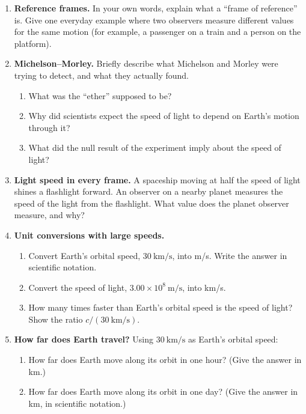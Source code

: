 \documentclass[12pt, twoside]{article}
\begin{document}
\begin{enumerate}[itemsep=0.5cm]

\item \textbf{Reference frames.} In your own words, explain what a ``frame of reference'' is. Give one everyday example where two observers measure different values for the same motion (for example, a passenger on a train and a person on the platform).
  \vspace{5cm}

\item \textbf{Michelson--Morley.} Briefly describe what Michelson and Morley were trying to detect, and what they actually found.
  \begin{enumerate}[itemsep=2cm]
    \item What was the ``ether'' supposed to be?
    \item Why did scientists expect the speed of light to depend on Earth's motion through it?
    \item What did the null result of the experiment imply about the speed of light?
  \end{enumerate}

\newpage
\item \textbf{Light speed in every frame.} A spaceship moving at half the speed of light shines a flashlight forward. An observer on a nearby planet measures the speed of the light from the flashlight. What value does the planet observer measure, and why?
  \vspace{6cm}

\item \textbf{Unit conversions with large speeds.}
  \begin{enumerate}[itemsep=2.25cm]
    \item Convert Earth's orbital speed, $30~\text{km/s}$, into m/s. Write the answer in scientific notation.
    \item Convert the speed of light, $3.00\times10^{8}~\text{m/s}$, into km/s.
    \item How many times faster than Earth's orbital speed is the speed of light? Show the ratio $c / (30~\text{km/s})$.
  \end{enumerate}

\newpage
\item \textbf{How far does Earth travel?} Using $30~\text{km/s}$ as Earth's orbital speed:
  \begin{enumerate}[itemsep=3cm]
    \item How far does Earth move along its orbit in one hour? (Give the answer in km.)
    \item How far does Earth move along its orbit in one day? (Give the answer in km, in scientific notation.)
  \end{enumerate}
  \vspace{0.5cm}


\end{enumerate}
\end{document}
